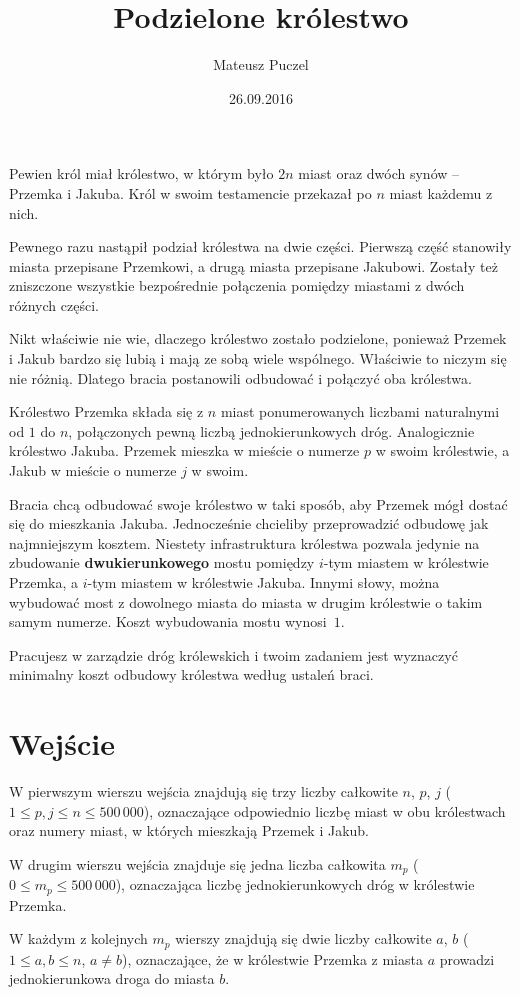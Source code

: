 \documentclass[zad,zawodnik,utf8]{sinol}
\title{Podzielone królestwo}
\author{Mateusz Puczel} %
\date{26.09.2016}
\begin{document}
\begin{tasktext}%
Pewien król miał królestwo, w którym było $2n$ miast oraz dwóch synów -- Przemka i Jakuba. Król w swoim testamencie przekazał po $n$ miast każdemu z nich.

Pewnego razu nastąpił podział królestwa na dwie części. Pierwszą część stanowiły miasta przepisane Przemkowi, a drugą miasta przepisane
Jakubowi. Zostały też zniszczone wszystkie bezpośrednie połączenia pomiędzy miastami z dwóch różnych części.

Nikt właściwie nie wie, dlaczego królestwo zostało podzielone, ponieważ Przemek i Jakub bardzo się lubią i
mają ze sobą wiele wspólnego. Właściwie to niczym
się nie różnią. Dlatego bracia postanowili odbudować i połączyć oba królestwa.

Królestwo Przemka składa się z $n$ miast ponumerowanych liczbami naturalnymi od $1$ do $n$,
połączonych pewną liczbą jednokierunkowych dróg. Analogicznie królestwo Jakuba.
Przemek mieszka w mieście o numerze $p$ w swoim królestwie, a Jakub w mieście o numerze $j$ w swoim.

Bracia chcą odbudować swoje królestwo w taki sposób, aby Przemek mógł dostać się do mieszkania Jakuba.
Jednocześnie chcieliby przeprowadzić odbudowę jak najmniejszym kosztem.
Niestety infrastruktura królestwa pozwala jedynie na zbudowanie \textbf{dwukierunkowego} mostu pomiędzy $i$-tym miastem w królestwie Przemka,
a $i$-tym miastem w królestwie Jakuba.
Innymi słowy, można wybudować most z dowolnego miasta do miasta w drugim królestwie o takim samym numerze.
Koszt wybudowania mostu wynosi~$1$.

Pracujesz w zarządzie dróg królewskich i twoim zadaniem jest wyznaczyć minimalny koszt odbudowy królestwa według ustaleń braci.

  \section{Wejście}
W pierwszym wierszu wejścia znajdują się trzy liczby całkowite $n$, $p$, $j$ ($1 \leq p, j \leq n \leq 500\,000$), oznaczające
odpowiednio liczbę miast w obu królestwach oraz numery miast, w których mieszkają Przemek i Jakub.

W drugim wierszu wejścia znajduje się jedna liczba całkowita $m_p$ ($0 \leq m_p \leq 500\,000$), oznaczająca liczbę jednokierunkowych
dróg w królestwie Przemka.

W każdym z kolejnych $m_p$ wierszy znajdują się dwie liczby całkowite $a$, $b$ ($1 \leq a, b \leq n$, $a \neq b$), oznaczające,
że w królestwie Przemka z miasta $a$ prowadzi jednokierunkowa droga do miasta $b$.


\end{tasktext}
\end{document}
